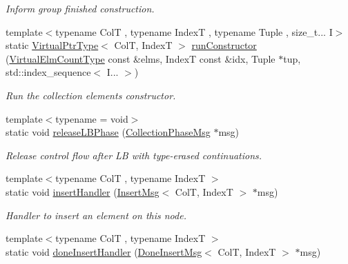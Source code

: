 \begin{DoxyCompactItemize}
\begin{DoxyCompactList}\small\item\em Inform group finished construction. \end{DoxyCompactList}\item 
{\footnotesize template$<$typename ColT , typename IndexT , typename Tuple , size\+\_\+t... I$>$ }\\static \hyperlink{structvt_1_1vrt_1_1collection_1_1_collection_manager_a1da9015e52d6ecca955f57b59aab0b82}{Virtual\+Ptr\+Type}$<$ ColT, IndexT $>$ \hyperlink{structvt_1_1vrt_1_1collection_1_1_collection_manager_a52ce99a3c227bfd77089725c3a173373}{run\+Constructor} (\hyperlink{namespacevt_ac115668758184050beff7a9281a2c490}{Virtual\+Elm\+Count\+Type} const \&elms, IndexT const \&idx, Tuple $\ast$tup, std\+::index\+\_\+sequence$<$ I... $>$)
\begin{DoxyCompactList}\small\item\em Run the collection element\textquotesingle{}s constructor. \end{DoxyCompactList}\item 
{\footnotesize template$<$typename  = void$>$ }\\static void \hyperlink{structvt_1_1vrt_1_1collection_1_1_collection_manager_a3d09a3058dd6984aeff47c89b6d571b3}{release\+L\+B\+Phase} (\hyperlink{structvt_1_1vrt_1_1collection_1_1_collection_phase_msg}{Collection\+Phase\+Msg} $\ast$msg)
\begin{DoxyCompactList}\small\item\em Release control flow after LB with type-\/erased continuations. \end{DoxyCompactList}\item 
{\footnotesize template$<$typename ColT , typename IndexT $>$ }\\static void \hyperlink{structvt_1_1vrt_1_1collection_1_1_collection_manager_afae2bb212583b7a9c6d73722c66961ef}{insert\+Handler} (\hyperlink{structvt_1_1vrt_1_1collection_1_1_insert_msg}{Insert\+Msg}$<$ ColT, IndexT $>$ $\ast$msg)
\begin{DoxyCompactList}\small\item\em Handler to insert an element on this node. \end{DoxyCompactList}\item 
{\footnotesize template$<$typename ColT , typename IndexT $>$ }\\static void \hyperlink{structvt_1_1vrt_1_1collection_1_1_collection_manager_ad0d2174c1605c18dfdc028679f1505ae}{done\+Insert\+Handler} (\hyperlink{structvt_1_1vrt_1_1collection_1_1_done_insert_msg}{Done\+Insert\+Msg}$<$ ColT, IndexT $>$ $\ast$msg)

\end{DoxyCompactItemize}
